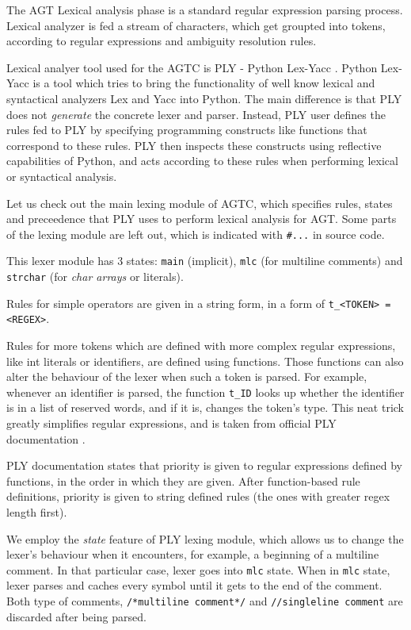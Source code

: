 \documentclass[times, utf8, diplomski]{fer}
\theoremstyle{definition}
\newcommand{\pythoncode}[3]{
    
}
\begin{document}
The AGT Lexical analysis phase is a standard regular expression parsing process.
Lexical analyzer is fed a stream of characters, which get groupted into tokens,
according to regular expressions and ambiguity resolution rules.

Lexical analyer tool used for the AGTC is PLY - Python Lex-Yacc \citep{c_ply_beazley}.
Python Lex-Yacc is a tool which tries to bring the functionality of well know
lexical and syntactical analyzers Lex and Yacc into Python. The main difference
is that PLY does not \textit{generate} the 
concrete lexer and parser. Instead, PLY user defines the rules fed to PLY by
specifying programming 
constructs like functions that correspond to these rules. PLY then inspects these constructs using 
reflective capabilities of Python, and acts according to these rules
when performing lexical or syntactical analysis.

Let us check out the main lexing module of AGTC, which specifies rules, states and preceedence that
PLY uses to perform lexical analysis for AGT. Some parts of the lexing module
are left out, which is indicated with \texttt{\#...} in source code.

\pythoncode{\resdir/compiler/lexer.py}{}{heyy}

This lexer module has 3 states: \texttt{main} (implicit), \texttt{mlc} (for multiline comments) 
and \texttt{strchar} (for \textit{char arrays} or  literals).

Rules for simple operators are given in a string form, 
in a form of \texttt{t\_<TOKEN> = <REGEX>}.

Rules for more tokens which are defined with more complex regular expressions, 
like int literals or identifiers, are defined using functions. 
Those functions can also alter the behaviour of the
lexer when such a token is parsed. For example, whenever an identifier is parsed,
the function \texttt{t\_ID} looks up whether the identifier is in a list of reserved
words, and if it is, changes the token's type. This neat trick greatly simplifies
regular expressions, and is taken from official PLY documentation \citep{c_ply_docs_beazley}.

PLY documentation states that priority is given to regular expressions defined by functions, 
in the order in which they are given.
After function-based rule definitions, 
priority is given to string defined rules (the ones with greater regex length first).

We employ the \textit{state} feature of PLY lexing module, 
which allows us to change the lexer's behaviour
when it encounters, for example, a beginning of a multiline comment. 
In that particular case, lexer goes into \texttt{mlc} state.
When in \texttt{mlc} state, lexer parses and caches every 
symbol until it gets to the end of the comment. 
Both type of comments, \texttt{/*multiline comment*/} and \texttt{//singleline comment} are discarded
after being parsed.
\end{document}
